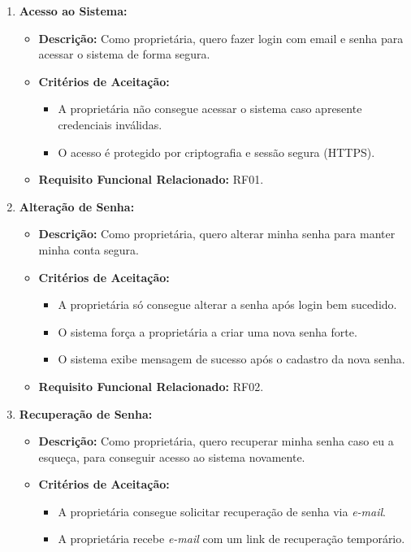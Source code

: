 \documentclass[
	12pt,				%
	openany,			%
	twoside,			%
	a4paper,			%
	english,			%
	french,				%
	spanish,			%
	brazil				%
	]{abntex2}
\begin{document}
\begin{enumerate}[label=\textbf{\arabic*.}]
	\item \textbf{Acesso ao Sistema:}
	\begin{itemize}
	 \item \textbf{Descrição:} Como proprietária, quero fazer login com email e senha para acessar o sistema de forma segura. 
	  \item	\textbf{Critérios de Aceitação:}	
	\begin{itemize} 
		\item A proprietária não consegue acessar o sistema caso apresente credenciais inválidas.
		\item O acesso é protegido por criptografia e sessão segura (HTTPS).
	\end{itemize}
	 \item \textbf{Requisito Funcional Relacionado:} RF01.
	 	\end{itemize} 
	 	\item \textbf{Alteração de Senha:}
	 	\begin{itemize}
	 		\item \textbf{Descrição:} Como proprietária, quero alterar minha senha para manter minha conta segura.
	 		\item \textbf{Critérios de Aceitação:}
	 		\begin{itemize} 
	 			\item A proprietária só consegue alterar a senha após login bem sucedido.
	 			\item O sistema força a proprietária a criar uma nova senha forte.
	 			\item O sistema exibe mensagem de sucesso após o cadastro da nova senha.
	 		\end{itemize}
	 		\item \textbf{Requisito Funcional Relacionado:} RF02.
	 	\end{itemize} 
	 	\item \textbf{Recuperação de Senha:}
	 	\begin{itemize}
	 		\item \textbf{Descrição:} Como proprietária, quero recuperar minha senha caso eu a esqueça, para conseguir acesso ao sistema novamente.
	 		\item \textbf{Critérios de Aceitação:}
	 		\begin{itemize} 
	 			\item A proprietária consegue solicitar recuperação de senha via \textit{e-mail}.
	 			\item A proprietária recebe \textit{e-mail} com um link de recuperação temporário.

\end{itemize}
\end{itemize}
\end{enumerate}
\end{document}
